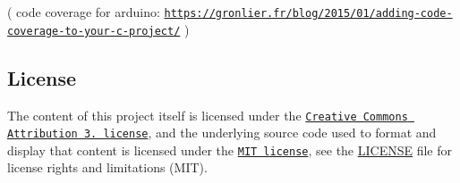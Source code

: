 ( code coverage for arduino\-: \href{https://gronlier.fr/blog/2015/01/adding-code-coverage-to-your-c-project/}{\tt https\-://gronlier.\-fr/blog/2015/01/adding-\/code-\/coverage-\/to-\/your-\/c-\/project/} )

\subsection*{License}

The content of this project itself is licensed under the \href{http://creativecommons.org/licenses/by/3.0/us/deed.en_US}{\tt Creative Commons Attribution 3. license}, and the underlying source code used to format and display that content is licensed under the \href{http://opensource.org/licenses/mit-license.php}{\tt M\-I\-T license}, see the \hyperlink{md_LICENSE}{L\-I\-C\-E\-N\-S\-E} file for license rights and limitations (M\-I\-T). 
